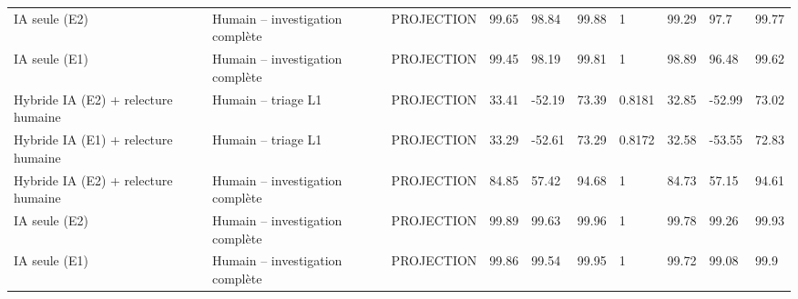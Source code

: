 \begin{table}[!t]
\begin{tabular}{llllllllll}
IA seule (E2) & Humain – investigation complète & PROJECTION & 99.65 & 98.84 & 99.88 & 1 & 99.29 & 97.7 & 99.77 \\
IA seule (E1) & Humain – investigation complète & PROJECTION & 99.45 & 98.19 & 99.81 & 1 & 98.89 & 96.48 & 99.62 \\
Hybride IA (E2) + relecture humaine & Humain – triage L1 & PROJECTION & 33.41 & -52.19 & 73.39 & 0.8181 & 32.85 & -52.99 & 73.02 \\
Hybride IA (E1) + relecture humaine & Humain – triage L1 & PROJECTION & 33.29 & -52.61 & 73.29 & 0.8172 & 32.58 & -53.55 & 72.83 \\
Hybride IA (E2) + relecture humaine & Humain – investigation complète & PROJECTION & 84.85 & 57.42 & 94.68 & 1 & 84.73 & 57.15 & 94.61 \\
IA seule (E2) & Humain – investigation complète & PROJECTION & 99.89 & 99.63 & 99.96 & 1 & 99.78 & 99.26 & 99.93 \\
IA seule (E1) & Humain – investigation complète & PROJECTION & 99.86 & 99.54 & 99.95 & 1 & 99.72 & 99.08 & 99.9 \\
\hline
\end{tabular}
\end{table}
